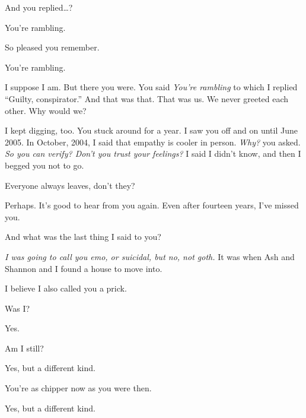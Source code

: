 \begin{paracol}{2}
\begin{leftcolumn}
And you replied\ldots{}?

\begin{ally}
You're rambling.
\end{ally}
So pleased you remember.

\begin{ally}
You're rambling.
\end{ally}
I suppose I am. But there you were. You said \emph{You're rambling} to which I replied ``Guilty, conspirator.'' And that was that. That was us. We never greeted each other. Why would we?

I kept digging, too. You stuck around for a year. I saw you off and on until June 2005. In October, 2004, I said that empathy is cooler in person. \emph{Why?} you asked. \emph{So you can verify? Don't you trust your feelings?} I said I didn't know, and then I begged you not to go.

\begin{ally}
Everyone always leaves, don't they?
\end{ally}
Perhaps. It's good to hear from you again. Even after fourteen years, I've missed you.

\begin{ally}
And what was the last thing I said to you?
\end{ally}
\emph{I was going to call you emo, or suicidal, but no, not goth.} It was when Ash and Shannon and I found a house to move into.

\begin{ally}
I believe I also called you a prick.
\end{ally}
Was I?

\begin{ally}
Yes.
\end{ally}
Am I still?

\begin{ally}
Yes, but a different kind.
\end{ally}
You're as chipper now as you were then.

\begin{ally}
Yes, but a different kind.
\end{ally}
\newpage

\end{leftcolumn}
\end{paracol}
